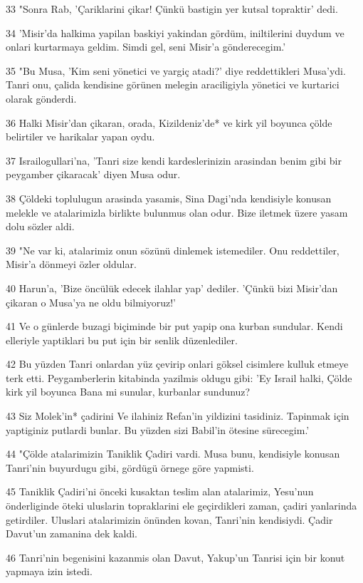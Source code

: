 \par 33 "Sonra Rab, 'Çariklarini çikar! Çünkü bastigin yer kutsal topraktir' dedi.
\par 34 'Misir'da halkima yapilan baskiyi yakindan gördüm, iniltilerini duydum ve onlari kurtarmaya geldim. Simdi gel, seni Misir'a gönderecegim.'
\par 35 "Bu Musa, 'Kim seni yönetici ve yargiç atadi?' diye reddettikleri Musa'ydi. Tanri onu, çalida kendisine görünen melegin araciligiyla yönetici ve kurtarici olarak gönderdi.
\par 36 Halki Misir'dan çikaran, orada, Kizildeniz'de* ve kirk yil boyunca çölde belirtiler ve harikalar yapan oydu.
\par 37 Israilogullari'na, 'Tanri size kendi kardeslerinizin arasindan benim gibi bir peygamber çikaracak' diyen Musa odur.
\par 38 Çöldeki toplulugun arasinda yasamis, Sina Dagi'nda kendisiyle konusan melekle ve atalarimizla birlikte bulunmus olan odur. Bize iletmek üzere yasam dolu sözler aldi.
\par 39 "Ne var ki, atalarimiz onun sözünü dinlemek istemediler. Onu reddettiler, Misir'a dönmeyi özler oldular.
\par 40 Harun'a, 'Bize öncülük edecek ilahlar yap' dediler. 'Çünkü bizi Misir'dan çikaran o Musa'ya ne oldu bilmiyoruz!'
\par 41 Ve o günlerde buzagi biçiminde bir put yapip ona kurban sundular. Kendi elleriyle yaptiklari bu put için bir senlik düzenlediler.
\par 42 Bu yüzden Tanri onlardan yüz çevirip onlari göksel cisimlere kulluk etmeye terk etti. Peygamberlerin kitabinda yazilmis oldugu gibi: 'Ey Israil halki, Çölde kirk yil boyunca Bana mi sunular, kurbanlar sundunuz?
\par 43 Siz Molek'in* çadirini Ve ilahiniz Refan'in yildizini tasidiniz. Tapinmak için yaptiginiz putlardi bunlar. Bu yüzden sizi Babil'in ötesine sürecegim.'
\par 44 "Çölde atalarimizin Taniklik Çadiri vardi. Musa bunu, kendisiyle konusan Tanri'nin buyurdugu gibi, gördügü örnege göre yapmisti.
\par 45 Taniklik Çadiri'ni önceki kusaktan teslim alan atalarimiz, Yesu'nun önderliginde öteki uluslarin topraklarini ele geçirdikleri zaman, çadiri yanlarinda getirdiler. Uluslari atalarimizin önünden kovan, Tanri'nin kendisiydi. Çadir Davut'un zamanina dek kaldi.
\par 46 Tanri'nin begenisini kazanmis olan Davut, Yakup'un Tanrisi için bir konut yapmaya izin istedi.
